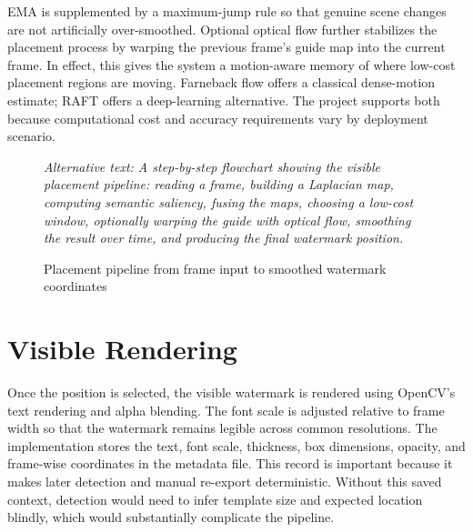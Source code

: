 \documentclass[12pt,oneside]{report}
\newcommand{\AltText}[1]{\par\small\textit{Alternative text: #1}\normalsize}
\begin{document}
EMA is supplemented by a maximum-jump rule so that genuine scene changes are not artificially over-smoothed. Optional optical flow further stabilizes the placement process by warping the previous frame's guide map into the current frame. In effect, this gives the system a motion-aware memory of where low-cost placement regions are moving. Farneback flow offers a classical dense-motion estimate; RAFT offers a deep-learning alternative. The project supports both because computational cost and accuracy requirements vary by deployment scenario.

\begin{figure}[htbp]
\centering
{}
\caption{Placement pipeline from frame input to smoothed watermark coordinates}
\AltText{A step-by-step flowchart showing the visible placement pipeline: reading a frame, building a Laplacian map, computing semantic saliency, fusing the maps, choosing a low-cost window, optionally warping the guide with optical flow, smoothing the result over time, and producing the final watermark position.}
\end{figure}

\section{Visible Rendering}
Once the position is selected, the visible watermark is rendered using OpenCV's text rendering and alpha blending. The font scale is adjusted relative to frame width so that the watermark remains legible across common resolutions. The implementation stores the text, font scale, thickness, box dimensions, opacity, and frame-wise coordinates in the metadata file. This record is important because it makes later detection and manual re-export deterministic. Without this saved context, detection would need to infer template size and expected location blindly, which would substantially complicate the pipeline.
\end{document}
